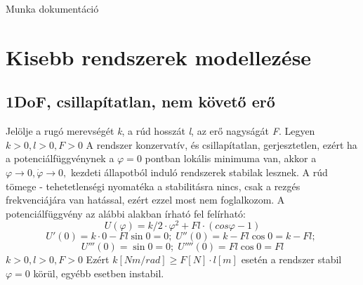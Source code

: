 \documentclass[12pt,twoside]{article}
\begin{document}
Munka dokumentáció 

 \section{Kisebb rendszerek modellezése }
 
\subsection{1DoF, csillapítatlan, nem követő erő} %
 Jelölje a rugó merevségét \emph{k}, a rúd hosszát \emph{l}, az erő nagyságát \emph{F}. Legyen $  k>0, l>0, F>0 $  \newline
 A rendszer konzervatív, és csillapítatlan, gerjesztetlen, ezért ha a potenciálfüggvénynek a $  \varphi =0 $ pontban lokális minimuma van, akkor a $  \varphi \rightarrow 0,  \dot \varphi \rightarrow 0, $ kezdeti állapotból induló rendszerek stabilak lesznek. A rúd tömege - tehetetlenségi nyomatéka a stabilitásra nincs, csak a rezgés frekvenciájára van hatással, ezért ezzel most nem foglalkozom. \newline
A potenciálfüggvény az alábbi alakban írható fel felírható:
\begin{equation} \label{eq:Newton}
U(\varphi)=k/2 \cdot \varphi ^2 + F l \cdot ( cos\varphi-1)
\end{equation}
 \begin{equation} \label{eq:Newton}
U'(0)=k \cdot 0 - F l \sin0=0 ; \;
U''(0)=k  - F l \cos0=k-Fl ; \;
\end{equation}
\begin{equation} \label{eq:Newton}
U'''(0)=\sin0=0;\;
U''''(0)=Fl\cos0=Fl
\end{equation}
$  k>0, l>0, F>0 $ Ezért $  k [Nm/rad]\geq F[N] \cdot l [m] $ esetén a rendszer stabil $  \varphi =0 $ körül, egyébb esetben instabil.
\end{document}
